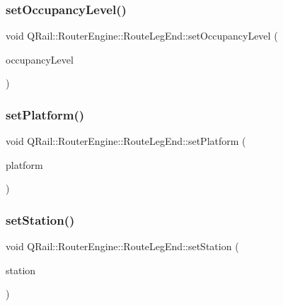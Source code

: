 \mbox{\label{classQRail_1_1RouterEngine_1_1RouteLegEnd_a42dfd2ffdc3ec201dbb30f73f6e4e764}} 
\subsubsection{\texorpdfstring{setOccupancyLevel()}{setOccupancyLevel()}}
{\footnotesize\ttfamily void Q\+Rail\+::\+Router\+Engine\+::\+Route\+Leg\+End\+::set\+Occupancy\+Level (\begin{DoxyParamCaption}\item[{const \mbox{\hyperlink{classQRail_1_1VehicleEngine_1_1Stop_ad967ed81b19762bd582c1af07354a6d4}{Q\+Rail\+::\+Vehicle\+Engine\+::\+Stop\+::\+Occupancy\+Level}} \&}]{occupancy\+Level }\end{DoxyParamCaption})}

\mbox{\label{classQRail_1_1RouterEngine_1_1RouteLegEnd_a3512f68f2e4b0fd3e118cfcee7c27dbc}} 
\subsubsection{\texorpdfstring{setPlatform()}{setPlatform()}}
{\footnotesize\ttfamily void Q\+Rail\+::\+Router\+Engine\+::\+Route\+Leg\+End\+::set\+Platform (\begin{DoxyParamCaption}\item[{const Q\+String \&}]{platform }\end{DoxyParamCaption})}

\mbox{\label{classQRail_1_1RouterEngine_1_1RouteLegEnd_acfd352512a9edeba950c4941401621eb}} 
\subsubsection{\texorpdfstring{setStation()}{setStation()}}
{\footnotesize\ttfamily void Q\+Rail\+::\+Router\+Engine\+::\+Route\+Leg\+End\+::set\+Station (\begin{DoxyParamCaption}\item[{\mbox{\hyperlink{classQRail_1_1StationEngine_1_1Station}{Station\+Engine\+::\+Station}} $\ast$}]{station }\end{DoxyParamCaption})}

